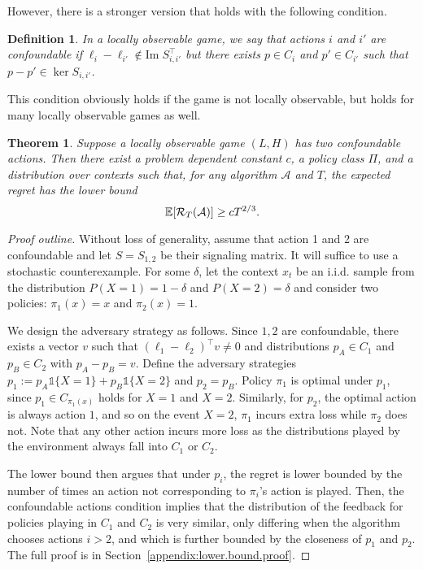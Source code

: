 \documentclass[11pt]{article}
\newcommand{\im}{{\mathrm{Im}\;}}
\newtheorem{definition}{Definition}
\newtheorem{theorem}{Theorem}
\begin{document}
However, there is a stronger version that holds with the following condition.
\begin{definition} 
  In a locally observable game, we say that actions $i$ and $i'$ are confoundable if $\ell_i - \ell_{i'}\notin \im S_{i,i'}^\top$ but there exists $p\in C_i$ and $p' \in C_{i'}$ such that $p - p' \in \ker S_{i,i'}$.
\end{definition}
This condition obviously holds if the game is not locally observable, but holds for many locally observable games as well.
\begin{theorem}
  Suppose a locally observable game $(L,H)$ has two confoundable actions. Then there exist a problem dependent constant $c$, a policy class $\Pi$, and a distribution over contexts such that, for any algorithm $\mathcal A$ and $T$, the expected regret has the lower bound
  \begin{equation*}
\mathbb E[ \mathcal R_T(\mathcal A)] \geq c T^{2/3}.
  \end{equation*}
\end{theorem}
\begin{proof}[Proof outline]
  Without loss of generality, assume that action 1 and 2 are confoundable and let $S = S_{1,2}$ be their signaling matrix. It will suffice to use a stochastic counterexample. For some $\delta$, let the context $x_t$ be an i.i.d. sample from the distribution $P(X = 1) = 1-\delta$ and $P(X=2) = \delta$ and consider two policies: $\pi_1(x) = x$ and $\pi_2(x) = 1$.

  We design the adversary strategy as follows.  Since $1,2$ are confoundable, there exists a vector $v$ such that $(\ell_1 - \ell_2)^\top v \neq 0$ and distributions $p_A\in C_1$ and $p_B \in C_2$ with $p_A - p_B = v$. Define the adversary strategies $p_1:= p_A\mathds{1}\{X=1\} + p_B\mathds{1}\{X=2\}$ and $p_2 = p_B$.  Policy $\pi_1$ is optimal under $p_1$, since $p_1 \in C_{\pi_1(x)}$ holds for $X=1$ and $X=2$. Similarly, for $p_2$, the optimal action is always action $1$, and so on the event $X=2$, $\pi_1$ incurs extra loss while $\pi_2$ does not. Note that any other action incurs more loss as the distributions played by the environment always fall into $C_1$ or $C_2$.

The lower bound then argues that under $p_i$, the regret is lower bounded by the number of times an action not corresponding to $\pi_i$'s action is played. Then, the confoundable actions condition implies that the distribution of the feedback for policies playing in $C_1$ and $C_2$ is very similar, only differing when the algorithm chooses actions $i>2$, and which is further bounded by the closeness of $p_1$ and $p_2$. The full proof is in Section~\ref{appendix:lower.bound.proof}.
\end{proof}
\end{document}
